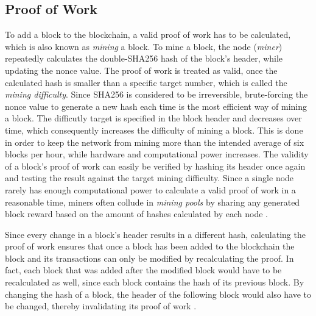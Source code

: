 \documentclass[a4paper,12pt,twoside]{report}
\begin{document}
\subsection{Proof of Work} \label{pow}
To add a block to the blockchain, a valid proof of work has to be calculated, which is also known as \textit{mining} a block. To mine a block, the node (\textit{miner}) repeatedly calculates the double-SHA256 hash of the block's header, while updating the nonce value. The proof of work is treated as valid, once the calculated hash is smaller than a specific target number, which is called the \textit{mining difficulty}. Since SHA256 is considered to be irreversible, brute-forcing the nonce value to generate a new hash each time is the most efficient way of mining a block. The difficutly target is specified in the block header and decreases over time, which consequently increases the difficulty of mining a block. This is done in order to keep the network from mining more than the intended average of six blocks per hour, while hardware and computational power increases. The validity of a block's proof of work can easily be verified by hashing its header once again and testing the result against the target mining difficulty. Since a single node rarely has enough computational power to calculate a valid proof of work in a reasonable time, miners often collude in \textit{mining pools} by sharing any generated block reward based on the amount of hashes calculated by each node \cite{antonopoulos2017mastering,okupski2014bitcoin}.

Since every change in a block's header results in a different hash, calculating the proof of work ensures that once a block has been added to the blockchain the block and its transactions can only be modified by recalculating the proof. In fact, each block that was added after the modified block would have to be recalculated as well, since each block contains the hash of its previous block. By changing the hash of a block, the header of the following block would also have to be changed, thereby invalidating its proof of work \cite{nakamoto2008bitcoin}.
\end{document}
